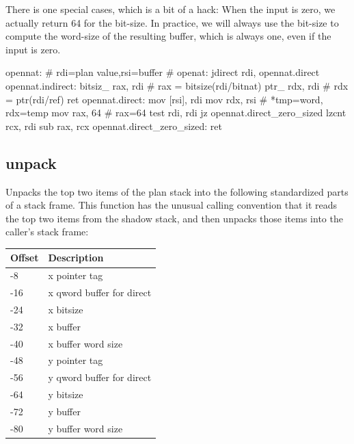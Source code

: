 There is one special cases, which is a bit of a hack: When the input is zero,
we actually return 64 for the bit-size.  In practice, we will always use the
bit-size to compute the word-size of the resulting buffer, which is always one,
even if the input is zero.

\begin{asm}
opennat: # rdi=plan value,rsi=buffer	    # openat:
	jdirect	rdi, opennat.direct
opennat.indirect:
	bitsiz_	rax, rdi		    # rax = bitsize(rdi/bitnat)
	ptr_	rdx, rdi		    # rdx = ptr(rdi/ref)
	ret
opennat.direct:
	mov	[rsi], rdi
	mov	rdx, rsi	            # *tmp=word, rdx=temp
	mov	rax, 64         	    # rax=64
	test	rdi, rdi
	jz	opennat.direct_zero_sized
	lzcnt	rcx, rdi
	sub	rax, rcx
opennat.direct_zero_sized:
	ret
\end{asm}

\subsection{unpack}

Unpacks the top two items of the plan stack into the following standardized
parts of a stack frame. This function has the unusual calling convention that
it reads the top two items from the shadow stack, and then unpacks those items
into the caller's stack frame:

\begin{table}[h]
\begin{tabular}{|l|l|}\hline
Offset & Description               \\\hline
-8     & x pointer tag             \\
-16    & x qword buffer for direct \\
-24    & x bitsize                 \\
-32    & x buffer                  \\
-40    & x buffer word size        \\
-48    & y pointer tag             \\
-56    & y qword buffer for direct \\
-64    & y bitsize                 \\
-72    & y buffer                  \\
-80    & y buffer word size        \\\hline
\end{tabular}
\end{table}


